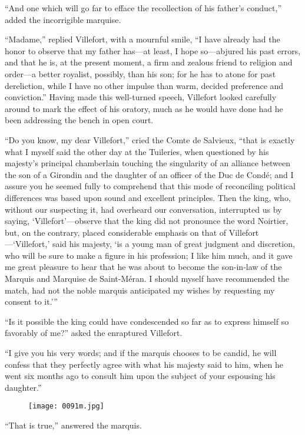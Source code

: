 “And one which will go far to efface the recollection of his father’s
conduct,” added the incorrigible marquise.

“Madame,” replied Villefort, with a mournful smile, “I have already had
the honor to observe that my father has—at least, I hope so—abjured his
past errors, and that he is, at the present moment, a firm and zealous
friend to religion and order—a better royalist, possibly, than his son;
for he has to atone for past dereliction, while I have no other impulse
than warm, decided preference and conviction.” Having made this
well-turned speech, Villefort looked carefully around to mark the
effect of his oratory, much as he would have done had he been
addressing the bench in open court.

“Do you know, my dear Villefort,” cried the Comte de Salvieux, “that is
exactly what I myself said the other day at the Tuileries, when
questioned by his majesty’s principal chamberlain touching the
singularity of an alliance between the son of a Girondin and the
daughter of an officer of the Duc de Condé; and I assure you he seemed
fully to comprehend that this mode of reconciling political differences
was based upon sound and excellent principles. Then the king, who,
without our suspecting it, had overheard our conversation, interrupted
us by saying, ‘Villefort’—observe that the king did not pronounce the
word Noirtier, but, on the contrary, placed considerable emphasis on
that of Villefort—‘Villefort,’ said his majesty, ‘is a young man of
great judgment and discretion, who will be sure to make a figure in his
profession; I like him much, and it gave me great pleasure to hear that
he was about to become the son-in-law of the Marquis and Marquise de
Saint-Méran. I should myself have recommended the match, had not the
noble marquis anticipated my wishes by requesting my consent to it.’”

“Is it possible the king could have condescended so far as to express
himself so favorably of me?” asked the enraptured Villefort.

“I give you his very words; and if the marquis chooses to be candid, he
will confess that they perfectly agree with what his majesty said to
him, when he went six months ago to consult him upon the subject of
your espousing his daughter.”

\begin{figure}[ht]
\texttt{[image: 0091m.jpg]}
\end{figure}

“That is true,” answered the marquis.

